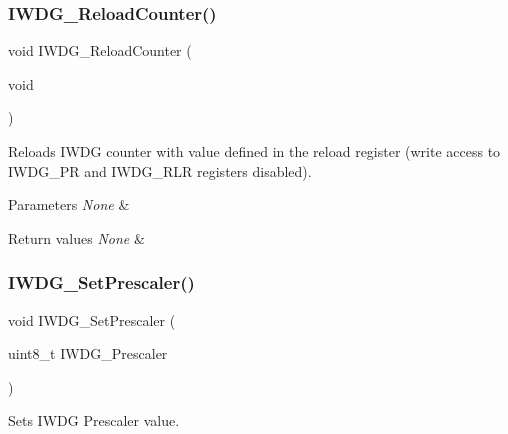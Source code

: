 \subsubsection{\texorpdfstring{IWDG\_ReloadCounter()}{IWDG\_ReloadCounter()}}
{\footnotesize\ttfamily void I\+W\+D\+G\+\_\+\+Reload\+Counter (\begin{DoxyParamCaption}\item[{void}]{ }\end{DoxyParamCaption})}



Reloads I\+W\+DG counter with value defined in the reload register (write access to I\+W\+D\+G\+\_\+\+PR and I\+W\+D\+G\+\_\+\+R\+LR registers disabled). 


\begin{DoxyParams}{Parameters}
{\em None} & \\
\hline
\end{DoxyParams}

\begin{DoxyRetVals}{Return values}
{\em None} & \\
\hline
\end{DoxyRetVals}
\mbox{\label{group___i_w_d_g___private___functions_ga4fa7f1cd690533a35ad9e4729c0450a3}} 
\subsubsection{\texorpdfstring{IWDG\_SetPrescaler()}{IWDG\_SetPrescaler()}}
{\footnotesize\ttfamily void I\+W\+D\+G\+\_\+\+Set\+Prescaler (\begin{DoxyParamCaption}\item[{uint8\+\_\+t}]{I\+W\+D\+G\+\_\+\+Prescaler }\end{DoxyParamCaption})}



Sets I\+W\+DG Prescaler value. 


